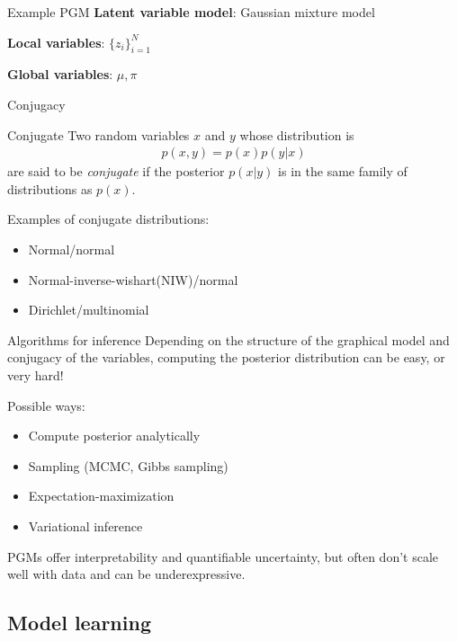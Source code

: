 \documentclass[10pt, compress]{beamer}
\begin{document}
\begin{frame}{Example PGM}
	\textbf{Latent variable model}: Gaussian mixture model
	\begin{center}
		
	\end{center}

	\pause
	\textbf{Local variables}: $\{z_i\}_{i=1}^N$

	\pause
	\textbf{Global variables}: $\mu, \pi$

\end{frame}

\begin{frame}{Conjugacy}
	\begin{block}{Conjugate}
		Two random variables $x$ and $y$ whose distribution is
		\begin{align*}p(x, y) = p(x)p(y | x)\end{align*} are said to be
			\emph{conjugate} if the posterior $p(x | y)$
		is in the same family of distributions as $p(x)$.
	\end{block}
	\pause
	Examples of conjugate distributions:
	\begin{itemize}
		\item Normal/normal
			\pause
		\item Normal-inverse-wishart(NIW)/normal
			\pause
		\item Dirichlet/multinomial
	\end{itemize}
\end{frame}

\begin{frame}{Algorithms for inference}
	Depending on the structure of the graphical model
	and conjugacy of the variables, computing the posterior distribution
	can be easy, or very hard!

	\pause
	Possible ways:
	\begin{itemize}
		\item<2-> Compute posterior analytically
			\pause
		\item<3-> Sampling (MCMC, Gibbs sampling)
			\pause
		\item<4-> Expectation-maximization
			\pause
		\item<5->\alert<6->{Variational inference}
	\end{itemize}
	\pause
	PGMs offer interpretability and quantifiable uncertainty,
	but often don't scale well with data
	and can be underexpressive.
\end{frame}

\subsection{Model learning}
\end{document}
